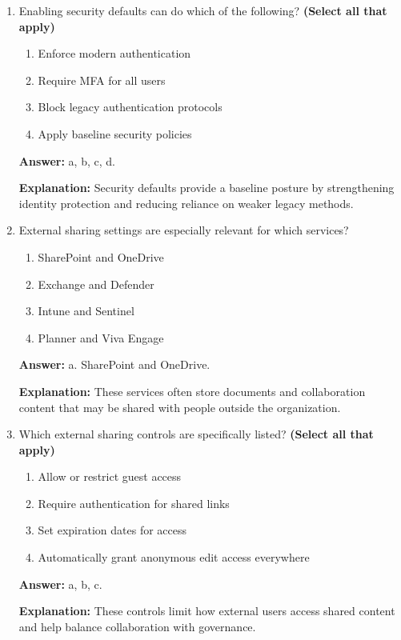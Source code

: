 \documentclass[10pt]{article}
\begin{document}
\begin{enumerate}[leftmargin=*]
\textbf{Explanation:} These branding elements help users recognize official portals and communications.

\item Enabling security defaults can do which of the following? \textbf{(Select all that apply)}
\begin{enumerate}[label=\alph*., leftmargin=1.5em]
\item Enforce modern authentication
\item Require MFA for all users
\item Block legacy authentication protocols
\item Apply baseline security policies
\end{enumerate}
\textbf{Answer:} a, b, c, d.

\textbf{Explanation:} Security defaults provide a baseline posture by strengthening identity protection and reducing reliance on weaker legacy methods.

\item External sharing settings are especially relevant for which services?
\begin{enumerate}[label=\alph*., leftmargin=1.5em]
\item SharePoint and OneDrive
\item Exchange and Defender
\item Intune and Sentinel
\item Planner and Viva Engage
\end{enumerate}
\textbf{Answer:} a. SharePoint and OneDrive.

\textbf{Explanation:} These services often store documents and collaboration content that may be shared with people outside the organization.

\item Which external sharing controls are specifically listed? \textbf{(Select all that apply)}
\begin{enumerate}[label=\alph*., leftmargin=1.5em]
\item Allow or restrict guest access
\item Require authentication for shared links
\item Set expiration dates for access
\item Automatically grant anonymous edit access everywhere
\end{enumerate}
\textbf{Answer:} a, b, c.

\textbf{Explanation:} These controls limit how external users access shared content and help balance collaboration with governance.


\end{enumerate}
\end{document}
